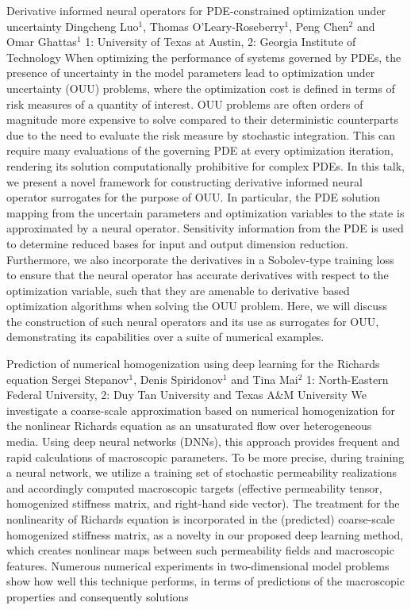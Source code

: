 \vspace{1.5ex}
\abs
{Derivative informed neural operators for PDE-constrained optimization under uncertainty}
{Dingcheng Luo$^1$, Thomas O'Leary-Roseberry$^1$, Peng Chen$^2$ and Omar Ghattas$^1$}
{1: University of Texas at Austin, 2: Georgia Institute of Technology}
{When optimizing the performance of systems governed by PDEs, the presence of uncertainty in the model parameters lead to optimization under uncertainty (OUU) problems, where the optimization cost is defined in terms of risk measures of a quantity of interest. OUU problems are often orders of magnitude more expensive to solve compared to their deterministic counterparts due to the need to evaluate the risk measure by stochastic integration. This can require many evaluations of the governing PDE at every optimization iteration, rendering its solution computationally prohibitive for complex PDEs. In this talk, we present a novel framework for constructing derivative informed neural operator surrogates for the purpose of OUU. In particular, the PDE solution mapping from the uncertain parameters and optimization variables to the state is approximated by a neural operator. Sensitivity information from the PDE is used to determine reduced bases for input and output dimension reduction. Furthermore, we also incorporate the derivatives in a Sobolev-type training loss to ensure that the neural operator has accurate derivatives with respect to the optimization variable, such that they are amenable to derivative based optimization algorithms when solving the OUU problem. Here, we will discuss the construction of such neural operators and its use as surrogates for OUU, demonstrating its capabilities over a suite of numerical examples.}


\vspace{1.5ex}
\abs
{Prediction of numerical homogenization using deep learning for the Richards equation}
{Sergei Stepanov$^1$, Denis Spiridonov$^1$ and Tina Mai$^2$}
{1: North-Eastern Federal University, 2: Duy Tan University and Texas A\&M University}
{We investigate a coarse-scale approximation based on numerical homogenization for the nonlinear Richards equation as an unsaturated flow over heterogeneous media. Using deep neural networks (DNNs), this approach provides frequent and rapid calculations of macroscopic parameters. To be more precise, during training a neural network, we utilize a training set of stochastic permeability realizations and accordingly computed macroscopic targets (effective permeability tensor, homogenized stiffness matrix, and right-hand side vector). The treatment for the nonlinearity of Richards equation is incorporated in the (predicted) coarse-scale homogenized stiffness matrix, as a novelty in our proposed deep learning method, which creates nonlinear maps between such permeability fields and macroscopic features. Numerous numerical experiments in two-dimensional model problems show how well this technique performs, in terms of predictions of the macroscopic properties and consequently solutions}


